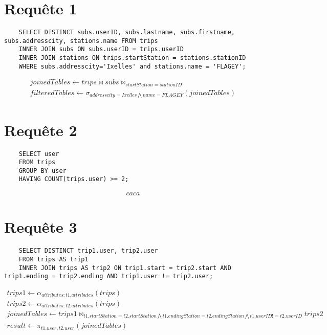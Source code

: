 \documentclass[a4paper,11pt]{article}
\begin{document}
\section{Requ\^ete 1}
    \begin{lstlisting}
    SELECT DISTINCT subs.userID, subs.lastname, subs.firstname, subs.addresscity, stations.name FROM trips 
    INNER JOIN subs ON subs.userID = trips.userID
    INNER JOIN stations ON trips.startStation = stations.stationID
    WHERE subs.addresscity='Ixelles' and stations.name = 'FLAGEY';
    \end{lstlisting}

    \begin{align}
    joinedTables \leftarrow trips \bowtie subs \bowtie_{startStation = stationID} \\
    filteredTables \leftarrow \sigma_{addresscity=Ixelles \bigwedge name=FLAGEY}(joinedTables)
    \end{align}

\section{Requ\^ete 2}
    \begin{lstlisting}
    SELECT user
    FROM trips
    GROUP BY user
    HAVING COUNT(trips.user) >= 2;
    \end{lstlisting}

    \begin{align}
    caca
    \end{align}


\section{Requ\^ete 3}
    \begin{lstlisting}
    SELECT DISTINCT trip1.user, trip2.user
    FROM trips AS trip1
    INNER JOIN trips AS trip2 ON trip1.start = trip2.start AND trip1.ending = trip2.ending AND trip1.user != trip2.user;
    \end{lstlisting}

    \begin{gather}
    trips1 \leftarrow \alpha_{attributes:t1.attributes}(trips)\\
    trips2 \leftarrow \alpha_{attributes:t2.attributes}(trips)\\
    joinedTables \leftarrow trips1 \bowtie_{t1.startStation = t2.startStation
    \bigwedge t1.endingStation = t2.endingStation \bigwedge t1.userID != t2.userID } trips2 \\
    result \leftarrow \pi_{t1.user,t2.user}(joinedTables)
    \end{gather}
\end{document}
